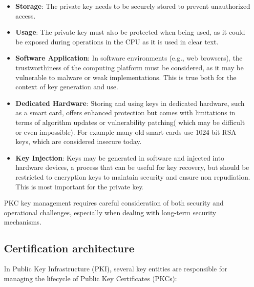 \begin{itemize}
  \item \textbf{Storage}: The private key needs to be securely
    stored to prevent unauthorized access.
  \item \textbf{Usage}: The private key must also be protected when
    being used, as it could be exposed during operations in the CPU as
    it is used in clear text.
  \item \textbf{Software Application}: In software environments
    (e.g., web browsers), the trustworthiness of the computing
    platform must be considered, as it may be vulnerable to malware
    or weak implementations. This is true both for the context of
    key generation and use.
  \item \textbf{Dedicated Hardware}: Storing and using keys in
    dedicated hardware, such as a smart card, offers enhanced
    protection but comes with limitations in terms of algorithm
    updates or vulnerability patching( which may be difficult or
    even impossible). For example many old smart cards use 1024-bit 
    RSA keys, which are considered insecure today.
  \item \textbf{Key Injection}: Keys may be generated in software
    and injected into hardware devices, a process that can be useful
    for key recovery, but should be restricted to encryption keys to
    maintain security and ensure non repudiation. This is most
    important for the private key. 
\end{itemize}

PKC key management requires careful consideration of both security and
operational challenges, especially when dealing with long-term
security mechanisms.

\subsection{Certification architecture}

In Public Key Infrastructure (PKI), several key entities are
responsible for managing the lifecycle of Public Key Certificates
(PKCs):

